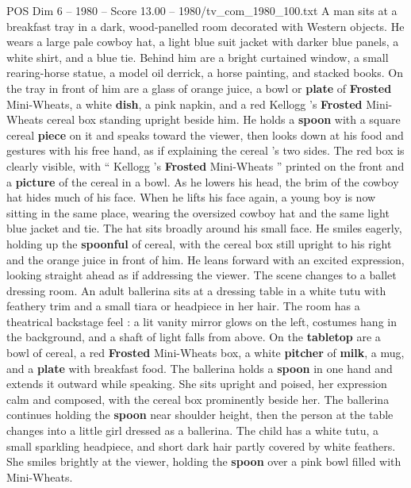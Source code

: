 \begin{textsample}{POS Dim 6 – 1980 – Score 13.00 – 1980/tv\_com\_1980\_100.txt}  \label{ex:f6_pos_034}
A man sits at a breakfast tray in a dark, wood-panelled room decorated with Western objects.
He wears a large pale cowboy hat, a light blue suit jacket with darker blue panels, a white shirt, and a blue tie.
Behind him are a bright curtained window, a small rearing-horse statue, a model oil derrick, a horse painting, and stacked books.
On the tray in front of him are a glass of orange juice, a bowl or \textbf{plate} of \textbf{Frosted} Mini-Wheats, a white \textbf{dish}, a pink napkin, and a red Kellogg ’s \textbf{Frosted} Mini-Wheats cereal box standing upright beside him.
He holds a \textbf{spoon} with a square cereal \textbf{piece} on it and speaks toward the viewer, then looks down at his food and gestures with his free hand, as if explaining the cereal ’s two sides.
The red box is clearly visible, with “ Kellogg ’s \textbf{Frosted} Mini-Wheats ” printed on the front and a \textbf{picture} of the cereal in a bowl.
As he lowers his head, the brim of the cowboy hat hides much of his face.
When he lifts his face again, a young boy is now sitting in the same place, wearing the oversized cowboy hat and the same light blue jacket and tie.
The hat sits broadly around his small face.
He smiles eagerly, holding up the \textbf{spoonful} of cereal, with the cereal box still upright to his right and the orange juice in front of him.
He leans forward with an excited expression, looking straight ahead as if addressing the viewer.
The scene changes to a ballet dressing room.
An adult ballerina sits at a dressing table in a white tutu with feathery trim and a small tiara or headpiece in her hair.
The room has a theatrical backstage feel : a lit vanity mirror glows on the left, costumes hang in the background, and a shaft of light falls from above.
On the \textbf{tabletop} are a bowl of cereal, a red \textbf{Frosted} Mini-Wheats box, a white \textbf{pitcher} of \textbf{milk}, a mug, and a \textbf{plate} with breakfast food.
The ballerina holds a \textbf{spoon} in one hand and extends it outward while speaking.
She sits upright and poised, her expression calm and composed, with the cereal box prominently beside her.
The ballerina continues holding the \textbf{spoon} near shoulder height, then the person at the table changes into a little girl dressed as a ballerina.
The child has a white tutu, a small sparkling headpiece, and short dark hair partly covered by white feathers.
She smiles brightly at the viewer, holding the \textbf{spoon} over a pink bowl filled with Mini-Wheats.

\end{textsample}
